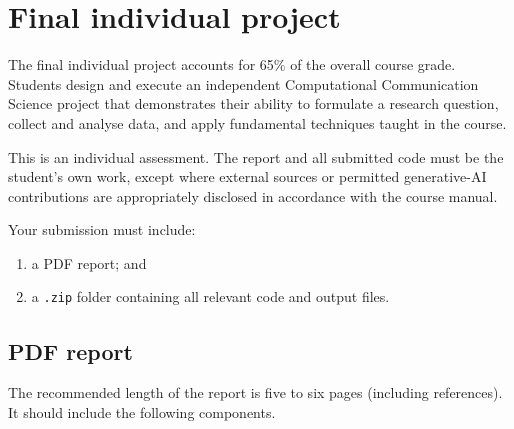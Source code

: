 \providecommand{\finalprojectheading}{\section{Final individual project}}
\finalprojectheading
\label{sec:final-project}

The final individual project accounts for 65\% of the overall course grade. Students design and execute an independent Computational Communication Science project that demonstrates their ability to formulate a research question, collect and analyse data, and apply fundamental techniques taught in the course.

This is an individual assessment. The report and all submitted code must be the student's own work, except where external sources or permitted generative-AI contributions are appropriately disclosed in accordance with the course manual.

Your submission must include:
\begin{enumerate}
    \item a PDF report; and
    \item a \texttt{.zip} folder containing all relevant code and output files.
\end{enumerate}

\subsection*{PDF report}

The recommended length of the report is five to six pages (including references). It should include the following components.

